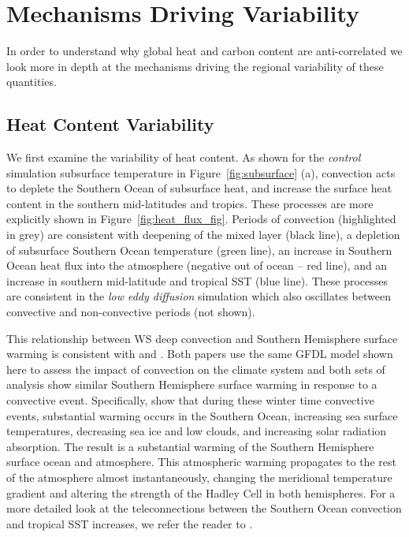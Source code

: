 \section{Mechanisms Driving Variability}
\label{section:Mechanisms}

In order to understand why global heat and carbon content are anti-correlated
we look more in depth at the mechanisms driving the regional variability of
these quantities.

\subsection{Heat Content Variability}
We first examine the variability of heat content. As shown for the \textit{control}
simulation subsurface temperature in Figure~\ref{fig:subsurface} (a), convection
acts to deplete the Southern Ocean of subsurface heat, and increase the surface
heat content in the southern mid-latitudes and tropics. These processes are more
explicitly shown in Figure~\ref{fig:heat_flux_fig}. Periods of convection
(highlighted in grey) are consistent with deepening of the mixed layer
(black line), a depletion of subsurface Southern Ocean temperature (green line),
an increase in Southern Ocean heat flux into the atmosphere (negative out of
ocean -- red line), and an increase in southern mid-latitude and tropical SST
(blue line). These processes are consistent in the \textit{low eddy diffusion}
simulation which  also oscillates between convective and non-convective periods
(not shown).

This relationship between WS deep convection and Southern
Hemisphere surface warming is consistent with \citet{Bernardello2014} and
\citet{Cabre}. Both papers use the same GFDL model shown here to assess the
impact of convection on the climate system and both sets of analysis show
similar Southern Hemisphere surface warming in response to a convective event.
Specifically, \citet{Cabre} show that during these winter time convective events,
substantial warming occurs in the Southern Ocean, increasing sea surface
temperatures, decreasing sea ice and low clouds, and increasing solar radiation
absorption. The result is a substantial warming of the Southern Hemisphere surface
ocean and atmosphere. This atmospheric warming propagates to the rest of the
atmosphere almost instantaneously, changing the meridional temperature gradient
and altering the strength of the Hadley Cell in both hemispheres. For a more
detailed look at the teleconnections between the Southern Ocean convection and
tropical SST increases, we refer the reader to \citet{Cabre}.

